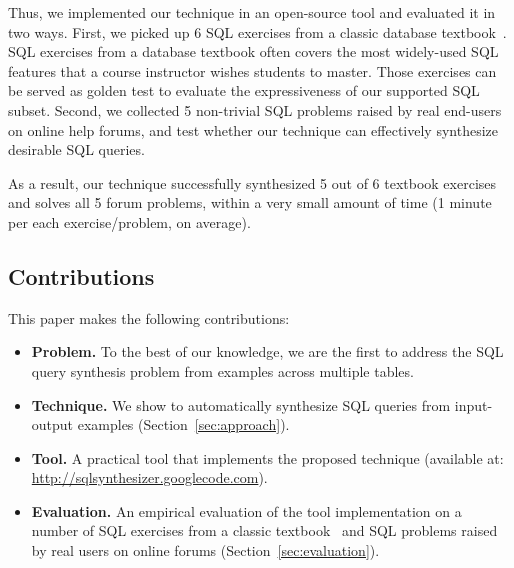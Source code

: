 Thus, we implemented our technique in an open-source tool
and evaluated it in two ways. First, we picked up 6 SQL
exercises from a classic database textbook~\cite{cowbook}. SQL exercises
from a database textbook often covers
the most widely-used SQL features 
that a course instructor wishes students to master.
Those exercises can be served as golden test
to evaluate the expressiveness of our supported SQL subset. Second,
we collected 5 non-trivial SQL problems raised by real end-users on online
help forums, and test whether our technique can effectively synthesize desirable
SQL queries.

As a result, our technique successfully synthesized 5 out of 6
textbook exercises and solves all 5 forum problems, within a very
small amount of time (1 minute per each exercise/problem, on average).

\subsection{Contributions}

This paper makes the following contributions:

\begin{itemize}
\item \textbf{Problem.} To the best of our knowledge, we are the first
to address the SQL query synthesis problem from examples across multiple
tables.

\item \textbf{Technique.} We show to automatically synthesize SQL
queries from input-output examples (Section~\ref{sec:approach}).

\item \textbf{Tool.} A practical tool that implements the proposed technique (available at:
\url{http://sqlsynthesizer.googlecode.com}).

\item \textbf{Evaluation.} An empirical evaluation of the tool implementation
on a number of SQL exercises from a classic textbook~\cite{cowbook}
and SQL problems raised by real users on online forums (Section~\ref{sec:evaluation}).
\end{itemize}
